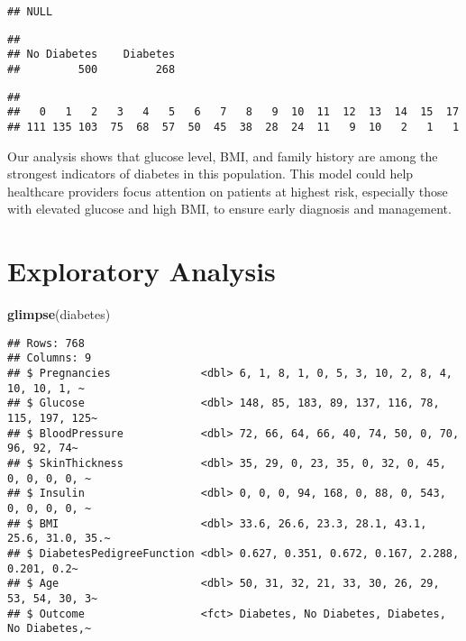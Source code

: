 \documentclass[
]{article}
\newenvironment{Shaded}{\begin{snugshade}}{\end{snugshade}}
\newcommand{\CommentTok}[1]{\textcolor[rgb]{0.56,0.35,0.01}{\textit{#1}}}
\newcommand{\FunctionTok}[1]{\textcolor[rgb]{0.13,0.29,0.53}{\textbf{#1}}}
\newcommand{\NormalTok}[1]{#1}
\newcommand{\SpecialCharTok}[1]{\textcolor[rgb]{0.81,0.36,0.00}{\textbf{#1}}}
\begin{document}
\begin{verbatim}
## NULL
\end{verbatim}

\begin{Shaded}
\end{Shaded}

\begin{verbatim}
## 
## No Diabetes    Diabetes 
##         500         268
\end{verbatim}

\begin{Shaded}
\end{Shaded}

\begin{verbatim}
## 
##   0   1   2   3   4   5   6   7   8   9  10  11  12  13  14  15  17 
## 111 135 103  75  68  57  50  45  38  28  24  11   9  10   2   1   1
\end{verbatim}

Our analysis shows that glucose level, BMI, and family history are among
the strongest indicators of diabetes in this population. This model
could help healthcare providers focus attention on patients at highest
risk, especially those with elevated glucose and high BMI, to ensure
early diagnosis and management.

\section{Exploratory Analysis}\label{exploratory-analysis}

\begin{Shaded}
\begin{Highlighting}[]
\FunctionTok{glimpse}\NormalTok{(diabetes)}
\end{Highlighting}
\end{Shaded}

\begin{verbatim}
## Rows: 768
## Columns: 9
## $ Pregnancies              <dbl> 6, 1, 8, 1, 0, 5, 3, 10, 2, 8, 4, 10, 10, 1, ~
## $ Glucose                  <dbl> 148, 85, 183, 89, 137, 116, 78, 115, 197, 125~
## $ BloodPressure            <dbl> 72, 66, 64, 66, 40, 74, 50, 0, 70, 96, 92, 74~
## $ SkinThickness            <dbl> 35, 29, 0, 23, 35, 0, 32, 0, 45, 0, 0, 0, 0, ~
## $ Insulin                  <dbl> 0, 0, 0, 94, 168, 0, 88, 0, 543, 0, 0, 0, 0, ~
## $ BMI                      <dbl> 33.6, 26.6, 23.3, 28.1, 43.1, 25.6, 31.0, 35.~
## $ DiabetesPedigreeFunction <dbl> 0.627, 0.351, 0.672, 0.167, 2.288, 0.201, 0.2~
## $ Age                      <dbl> 50, 31, 32, 21, 33, 30, 26, 29, 53, 54, 30, 3~
## $ Outcome                  <fct> Diabetes, No Diabetes, Diabetes, No Diabetes,~
\end{verbatim}
\end{document}
